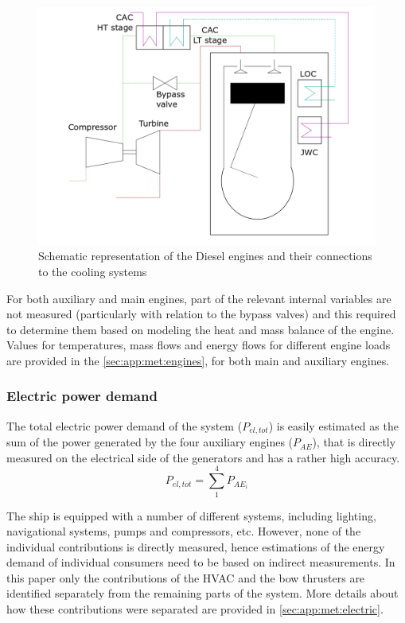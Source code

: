 \documentclass[preprint,12pt]{elsarticle}
\begin{document}
\begin{figure}
	\centering
	\includegraphics[width=0.9\linewidth]{Figures/DieselEngines}
	\caption{Schematic representation of the Diesel engines and their connections to the cooling systems}
	\label{fig:DieselEngines}
\end{figure}

For both auxiliary and main engines, part of the relevant internal variables are not measured (particularly with relation to the bypass valves) and this required to determine them based on modeling the heat and mass balance of the engine. Values for temperatures, mass flows and energy flows for different engine loads are provided in the \ref{sec:app:met:engines}, for both main and auxiliary engines. 







\subsubsection{Electric power demand} \label{sec:met:electric}

The total electric power demand of the system ($P_{el,tot}$) is easily estimated as the sum of the power generated by the four auxiliary engines ($P_{AE}$), that is directly measured on the electrical side of the generators and has a rather high accuracy.
\begin{equation}
P_{el,tot} = \sum_{1}^{4} P_{AE_i}
\end{equation}


The ship is equipped with a number of different systems, including lighting, navigational systems, pumps and compressors, etc. However, none of the individual contributions is directly measured, hence estimations of the energy demand of individual consumers need to be based on indirect measurements. In this paper only the contributions of the HVAC and the bow thrusters are identified separately from the remaining parts of the system. More details about how these contributions were separated are provided in \ref{sec:app:met:electric}.
\end{document}
